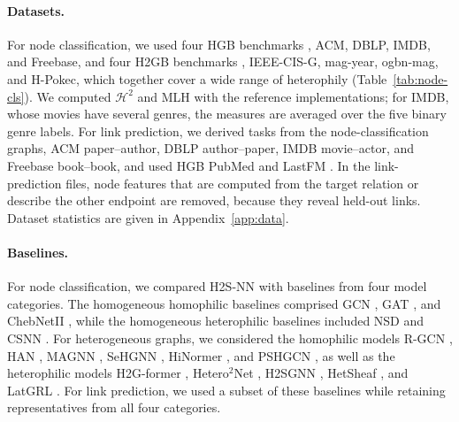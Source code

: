 \documentclass{article}
\newcommand{\method}{\textsc{H2S-NN}}
\begin{document}
\paragraph{Datasets.}
For node classification, we used four HGB benchmarks \cite{lv2021hgb}, ACM, DBLP, IMDB, and Freebase, and four H2GB benchmarks \cite{lin2025heterophily}, IEEE-CIS-G, mag-year, ogbn-mag, and H-Pokec, which together cover a wide range of heterophily (Table~\ref{tab:node-cls}). We computed $\mathcal{H}^2$ and MLH with the reference implementations; for IMDB, whose movies have several genres, the measures are averaged over the five binary genre labels. For link prediction, we derived tasks from the node-classification graphs, ACM paper--author, DBLP author--paper, IMDB movie--actor, and Freebase book--book, and used HGB PubMed and LastFM \cite{lv2021hgb}. In the link-prediction files, node features that are computed from the target relation or describe the other endpoint are removed, because they reveal held-out links. Dataset statistics are given in Appendix~\ref{app:data}.

\paragraph{Baselines.}
For node classification, we compared \method{} with baselines from four model categories. The homogeneous homophilic baselines comprised GCN \cite{kipf2017gcn}, GAT \cite{velickovic2018gat}, and ChebNetII \cite{he2022chebnetii}, while the homogeneous heterophilic baselines included NSD \cite{bodnar2022neural} and CSNN \cite{ribeiro2026cooperative}. For heterogeneous graphs, we considered the homophilic models R-GCN \cite{schlichtkrull2018rgcn}, HAN \cite{wang2019han}, MAGNN \cite{fu2020magnn}, SeHGNN \cite{yang2023sehgnn}, HiNormer \cite{mao2023hinormer}, and PSHGCN \cite{he2024spectral}, as well as the heterophilic models H2G-former \cite{lin2025heterophily}, Hetero$^2$Net \cite{li2025hetero2net}, H2SGNN \cite{lu2026addressing}, HetSheaf \cite{braithwaite2024heterogeneous}, and LatGRL \cite{shen2025heterophily}. For link prediction, we used a subset of these baselines while retaining representatives from all four categories.
\end{document}
